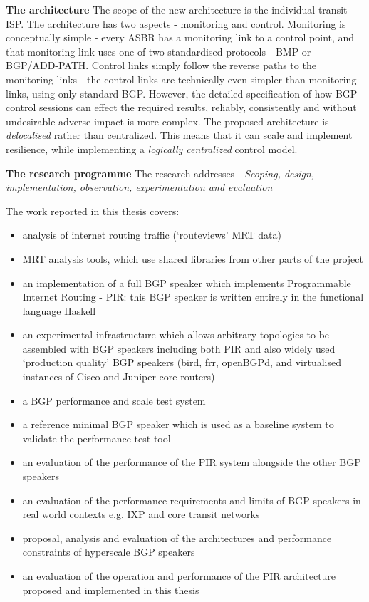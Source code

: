 \textbf{The architecture}
The scope of the new architecture is the individual transit ISP.
The architecture has two aspects - monitoring and control.
Monitoring is conceptually simple - every ASBR has a monitoring link to a control point, and that monitoring link uses one of two standardised protocols - BMP or BGP/ADD-PATH.
Control links simply follow the reverse paths to the monitoring links - the control links are technically even simpler than monitoring links, using only standard BGP.
However, the detailed specification of how BGP control sessions can effect the required results, reliably, consistently and without undesirable adverse impact is more complex.
The proposed architecture is \emph{delocalised} rather than centralized.
This means that it can scale and implement resilience, while implementing a \emph{logically centralized} control model.
\medskip

\textbf{The research programme} The research addresses - \emph{Scoping, design, implementation, observation, experimentation and evaluation}

The work reported in this thesis covers:
\begin{itemize}[noitemsep,nolistsep]
	\item{analysis of internet routing traffic (‘routeviews’ MRT data)
	      }\item{MRT analysis tools, which use shared libraries from other parts of the project
	      }\item{an implementation of a full BGP speaker which implements Programmable Internet Routing - PIR: this BGP speaker is written entirely in the functional language Haskell
	      }\item{an experimental infrastructure which allows arbitrary topologies to be assembled with BGP speakers including both PIR and also widely used ‘production quality’ BGP speakers (bird, frr, openBGPd, and virtualised instances of Cisco and Juniper core routers)
	      }\item{a BGP performance and scale test system
	      }\item{a reference minimal BGP speaker which is used as a baseline system to validate the performance test tool
	      }\item{an evaluation of the performance of the PIR system alongside the other BGP speakers
	      }\item{an evaluation of the performance requirements and limits of BGP speakers in real world contexts e.g. IXP and core transit networks
	      }\item{proposal, analysis and evaluation of the architectures and performance constraints of hyperscale BGP speakers
	      }\item{an evaluation of the operation and performance of the PIR architecture proposed and implemented in this thesis}

\end{itemize}

